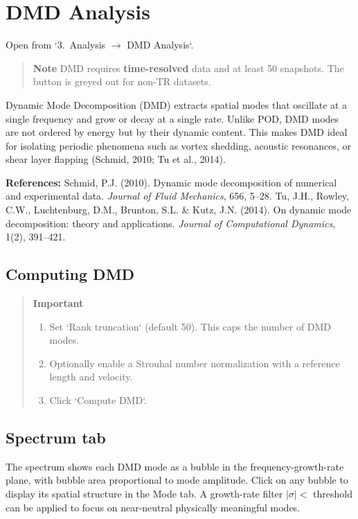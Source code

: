 \section{DMD Analysis}
\label{ch:dmd}

Open from `3.\ Analysis $\to$ DMD Analysis`.

\begin{quote}
\textbf{Note}
DMD requires \textbf{time-resolved} data and at least 50 snapshots. The button is greyed out for non-TR datasets.
\end{quote}

Dynamic Mode Decomposition (DMD) extracts spatial modes that oscillate at a single frequency and grow or decay at a single rate. Unlike POD, DMD modes are not ordered by energy but by their dynamic content. This makes DMD ideal for isolating periodic phenomena such as vortex shedding, acoustic resonances, or shear layer flapping (Schmid, 2010; Tu et al., 2014).

\noindent\textbf{References:} Schmid, P.J. (2010). Dynamic mode decomposition of numerical and experimental data. \textit{Journal of Fluid Mechanics}, 656, 5--28. Tu, J.H., Rowley, C.W., Luchtenburg, D.M., Brunton, S.L. \& Kutz, J.N. (2014). On dynamic mode decomposition: theory and applications. \textit{Journal of Computational Dynamics}, 1(2), 391--421.

\subsection{Computing DMD}

\begin{quote}
\textbf{Important}
\begin{enumerate}[leftmargin=1.5em, topsep=2pt]
  \item Set `Rank truncation` (default 50). This caps the number of DMD modes.
  \item Optionally enable a Strouhal number normalization with a reference length and velocity.
  \item Click `Compute DMD`.
\end{enumerate}
\end{quote}

\subsection{Spectrum tab}

The spectrum shows each DMD mode as a bubble in the frequency-growth-rate plane, with bubble area proportional to mode amplitude. Click on any bubble to display its spatial structure in the Mode tab. A growth-rate filter $|\sigma| < $ threshold can be applied to focus on near-neutral physically meaningful modes.

